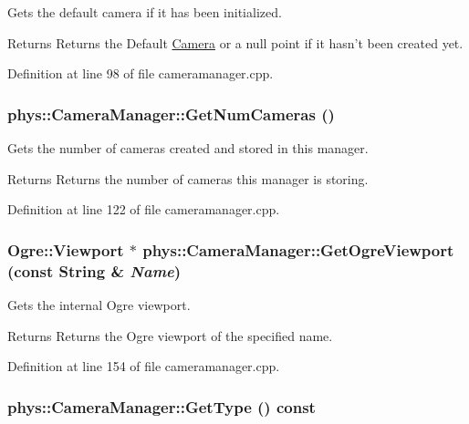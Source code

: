 Gets the default camera if it has been initialized. 

\begin{DoxyReturn}{Returns}
Returns the Default \hyperlink{classphys_1_1Camera}{Camera} or a null point if it hasn't been created yet. 
\end{DoxyReturn}


Definition at line 98 of file cameramanager.cpp.

\hypertarget{classphys_1_1CameraManager_a1a2111b4868bec403979b354395c4caf}{
\subsubsection[{GetNumCameras}]{ phys::CameraManager::GetNumCameras ()}}
\label{d9/d91/classphys_1_1CameraManager_a1a2111b4868bec403979b354395c4caf}


Gets the number of cameras created and stored in this manager. 

\begin{DoxyReturn}{Returns}
Returns the number of cameras this manager is storing. 
\end{DoxyReturn}


Definition at line 122 of file cameramanager.cpp.

\hypertarget{classphys_1_1CameraManager_ac1b9928181ee006fea42152f3ea406cb}{
\subsubsection[{GetOgreViewport}]{\setlength{\rightskip}{0pt plus 5cm}Ogre::Viewport $\ast$ phys::CameraManager::GetOgreViewport (const {\bf String} \& {\em Name})}}
\label{d9/d91/classphys_1_1CameraManager_ac1b9928181ee006fea42152f3ea406cb}


Gets the internal Ogre viewport. 

\begin{DoxyReturn}{Returns}
Returns the Ogre viewport of the specified name. 
\end{DoxyReturn}


Definition at line 154 of file cameramanager.cpp.

\hypertarget{classphys_1_1CameraManager_a8412ea634307aa280b615a3cc7c9b739}{
\subsubsection[{GetType}]{ phys::CameraManager::GetType () const}}
\label{d9/d91/classphys_1_1CameraManager_a8412ea634307aa280b615a3cc7c9b739}


